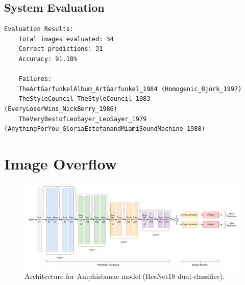\begin{uomappendix}
            \subsection{System Evaluation}
    
                \begin{adjustbox}{max width=\textwidth}
                    \begin{lstlisting}[caption={Ouroboros model evaluation results on test set \ref{data:trueTest} (34 images)}, label={lst:ourobEval}]
    Evaluation Results:
    Total images evaluated: 34
    Correct predictions: 31
    Accuracy: 91.18%
    
    Failures:
    TheArtGarfunkelAlbum_ArtGarfunkel_1984 (Homogenic_Björk_1997)
    TheStyleCouncil_TheStyleCouncil_1983 (EveryLoserWins_NickBerry_1986)
    TheVeryBestofLeoSayer_LeoSayer_1979 (AnythingForYou_GloriaEstefanandMiamiSoundMachine_1988)
                    \end{lstlisting}
                \end{adjustbox}
    
        \section{Image Overflow} \label{app:img}
    
            \begin{figure}[htbp]
                \centering
                \includegraphics[width=\linewidth]{images/Amphisbanae.pdf}
                \caption{Architecture for Amphisbanae model (ResNet18 dual-classifier).}
                \label{fig:AmphisbanaeCNN}
            \end{figure}
    

\end{uomappendix}
